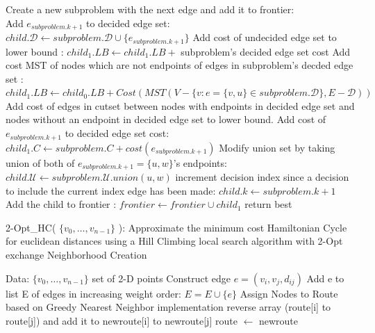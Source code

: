 \documentclass[format=sigconf]{acmart}
\begin{document}
\begin{algorithm}[H]
\begin{algorithmic}
						\ENDIF
					\ELSE
						\STATE Create a new subproblem with the next edge and add it to frontier:\\
						\vspace{4pt}
						\STATE Add $e_{subproblem.k+1}$ to decided edge set: $child.\mathcal{D} \leftarrow subproblem.\mathcal{D} \cup \{ e_{subproblem.k+1} \}$
						\STATE Add cost of undecided edge set to lower bound : $child_1.LB \leftarrow child_1.LB + $ subproblem's decided edge set cost
						\STATE Add cost MST of nodes which are not endpoints of edges in subproblem's decded edge set : \\
						$child_1.LB \leftarrow child_0.LB + Cost( MST( V - \{ v : e = \{ v,u \} \in subproblem.\mathcal{D} \}, E-\mathcal{D} ) )$ 
						\STATE Add cost of edges in cutset between nodes with endpoints in decided edge set and nodes without an endpoint in decided edge set to lower bound.
						\STATE Add cost of $e_{subproblem.k+1}$ to decided edge set cost: $child_1.C \leftarrow subproblem.C + cost(e_{subproblem.k+1})$ 
						\STATE Modify union set by taking union of both of $e_{subproblem.k+1}=\{u,w\}$'s endpoints: $child.\mathcal{U} \leftarrow subproblem.\mathcal{U}.union(u,w)$ 
						\STATE increment decision index since a decision to include the current index edge has been made: $child.k \leftarrow subproblem.k+1$
						\STATE Add the child to frontier : $frontier \leftarrow frontier \cup child_1$
					\ENDIF 
				\ENDIF
			\ENDIF
		\ENDWHILE
		\STATE return best
	\end{algorithmic}
\end{algorithm}
\begin{algorithm}[H] 
	\caption{  2-Opt\_HC( $\{v_0, \hdots, v_{n-1}\}$ ): Approximate the minimum cost Hamiltonian Cycle for euclidean distances using a Hill Climbing local search algorithm with 2-Opt exchange Neighborhood Creation}
	\begin{algorithmic} 
		\STATE Data: $\{v_0, \hdots, v_{n-1}\}$ set of 2-D points
			\STATE Construct edge $e = (v_i, v_j, d_{ij})$
			\STATE Add e to list E of edges in increasing weight order: $E = E \cup \{e\}$
		\ENDFOR
			\STATE Assign Nodes to Route based on Greedy Nearest Neighbor implementation
		\ENDWHILE
				\STATE reverse array (route[i] to route[j]) and add it to newroute[i] to newroute[j]
					\STATE route $\leftarrow$ newroute
				\ENDIF
			\ENDFOR
		\ENDFOR

	\end{algorithmic}
\end{algorithm}
\end{document}
